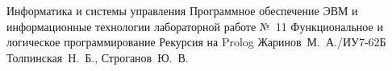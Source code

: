 \documentclass[a4paper,oneside,14pt]{extarticle}
\begin{document}
\makereporttitle
{Информатика и системы управления} %
{Программное обеспечение ЭВМ и информационные технологии} %
{лабораторной работе №~11} %
{Функциональное и логическое программирование} %
{Рекурсия на Prolog} %
{} %
{Жаринов~М.~А./ИУ7-62Б} %
{Толпинская~Н.~Б., Строганов~Ю.~В.} %

\setcounter{page}{2}





\end{document}
